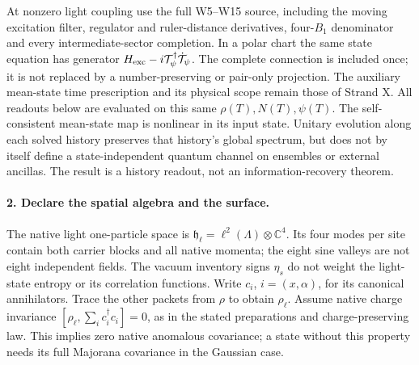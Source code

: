 \documentclass[11pt]{article}
\begin{document}
At nonzero light coupling use the full W5--W15 source, including the
moving excitation filter, regulator and ruler-distance derivatives,
four-$B_1$ denominator and every intermediate-sector completion.
In a polar chart the same state equation has generator
$H_{\rm exc}-i{\cal T}_\psi^\dagger\dot{\cal T}_\psi$.
The complete connection is included once; it is not replaced by a
number-preserving or pair-only projection.  The auxiliary mean-state
time prescription and its physical scope remain those of Strand X.
All readouts below are evaluated on this same $\rho(T),N(T),\psi(T)$.
The self-consistent mean-state map is nonlinear in its input state.
Unitary evolution along each solved history preserves that history's
global spectrum, but does not by itself define a state-independent
quantum channel on ensembles or external ancillas.  The result is a
history readout, not an information-recovery theorem.

\paragraph{2. Declare the spatial algebra and the surface.}
The native light one-particle space is
$\mathfrak h_\ell=\ell^2(\Lambda)\otimes{\mathbb C}^4$.
Its four modes per site contain both carrier blocks and all native
momenta; the eight sine valleys are not eight independent fields.
The vacuum inventory signs $\eta_s$ do not weight the light-state
entropy or its correlation functions.
Write $c_i$, $i=(x,\alpha)$, for its canonical annihilators.
Trace the other packets from $\rho$ to obtain $\rho_\ell$.
Assume native charge invariance $[\rho_\ell,\sum_i c_i^\dagger c_i]=0$,
as in the stated preparations and charge-preserving law.  This implies
zero native anomalous covariance; a state without this property needs
its full Majorana covariance in the Gaussian case.
\end{document}
